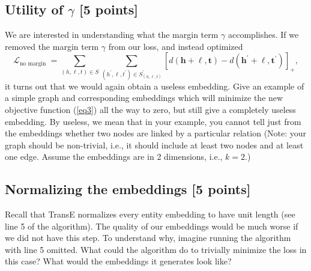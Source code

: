 \subsection{Utility of $\gamma$ [5 points]}
We are interested in understanding what the margin term $\gamma$ accomplishes. If we removed the margin term $\gamma$ from our loss, and instead optimized
\begin{equation}\label{eq3}
\mathcal{L}_{\text {no margin }}=\sum_{(h, \ell, t) \in S} \sum_{\left(h^{\prime}, \ell, t^{\prime}\right) \in S_{(h, \ell, t)}^{\prime}}\left[d(\mathbf{h}+\boldsymbol{\ell}, \mathbf{t})-d\left(\mathbf{h}^{\prime}+\boldsymbol{\ell}, \mathbf{t}^{\prime}\right)\right]_{+},
\end{equation}
it turns out that we would again obtain a useless embedding. Give an example of a simple graph and corresponding embeddings which will minimize the new objective function (\ref{eq3}) all the way to zero, but still give a completely useless embedding. By useless, we mean that in your example, you cannot tell just from the embeddings whether two nodes are linked by a particular relation (Note: your graph should be non-trivial, i.e., it should include at least two nodes and at least one edge. Assume the embeddings are in 2 dimensions, i.e., $k=2$.)

\Solution{
    
}

\subsection{ Normalizing the embeddings [5 points]}
Recall that TransE normalizes every entity embedding to have unit length (see line 5 of the algorithm). The quality of our embeddings would be much worse if we did not have this step. To understand why, imagine running the algorithm with line 5 omitted.
What could the algorithm do to trivially minimize the loss in this case? What would the embeddings
it generates look like?


